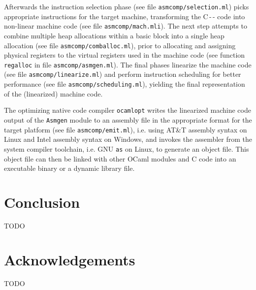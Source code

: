 \documentclass[10pt,a4paper,draft,twocolumn]{article}
\begin{document}
Afterwards the instruction selection phase (see file \texttt{asmcomp/selection.ml}) picks appropriate
instructions for the target machine, transforming the \mbox{C\,-\,-} code into non-linear machine
code (see file \texttt{asmcomp/mach.mli}). The next step attempts to combine multiple heap allocations
within a basic block into a single heap allocation (see file \texttt{asmcomp/comballoc.ml}), prior to
allocating and assigning physical registers to the virtual registers used in the machine code (see
function \texttt{regalloc} in file \texttt{asmcomp/asmgen.ml}).
The final phases linearize the machine code (see file \texttt{asmcomp/linearize.ml}) and perform
instruction scheduling for better performance (see file \texttt{asmcomp/scheduling.ml}), yielding the
final representation of the (linearized) machine code.

The optimizing native code compiler \texttt{ocamlopt} writes the linearized machine code output of
the \texttt{Asmgen} module to an assembly file in the appropriate format for the target platform (see
file \texttt{asmcomp/emit.ml}), i.e. using AT\&T assembly syntax on Linux and Intel assembly syntax
on Windows, and invokes the assembler from the system compiler toolchain, i.e. GNU \texttt{as} on Linux,
to generate an object file. This object file can then be linked with other OCaml modules and C code into
an executable binary or a dynamic library file.


\section{Conclusion} \label{section:Conclusion}

TODO


\section*{Acknowledgements}

TODO




\end{document}
